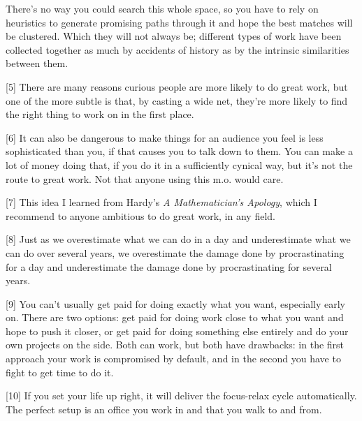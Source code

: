There's
                  no way you could search this whole space, so you have to rely
                  on heuristics to generate promising paths through it and hope
                  the best matches will be clustered. Which they will not always
                  be; different types of work have been collected together as
                  much by accidents of history as by the intrinsic similarities
                  between them.

[5] There are many reasons curious people are more likely to do
                  great work, but one of the more subtle is that, by casting a
                  wide net, they're more likely to find the right thing to work
                  on in the first place.

[6] It can also be dangerous to make things for an audience you
                  feel is less sophisticated than you, if that causes you to
                  talk down to them. You can make a lot of money doing that, if
                  you do it in a sufficiently cynical way, but it's not the
                  route to great work. Not that anyone using this m.o. would
                  care.

[7] This idea I learned from Hardy's
                  \emph{A Mathematician's Apology}, which I recommend to anyone
                  ambitious to do great work, in any field.

[8] Just as we overestimate what we can do in a day and
                  underestimate what we can do over several years, we
                  overestimate the damage done by procrastinating for a day and
                  underestimate the damage done by procrastinating for several
                  years.

[9] You can't usually get paid for doing exactly what you want,
                  especially early on. There are two options: get paid for doing
                  work close to what you want and hope to push it closer, or get
                  paid for doing something else entirely and do your own
                  projects on the side. Both can work, but both have drawbacks:
                  in the first approach your work is compromised by default, and
                  in the second you have to fight to get time to do it.

[10] If you set your life up right, it will deliver the
                  focus-relax cycle automatically. The perfect setup is an
                  office you work in and that you walk to and from.

